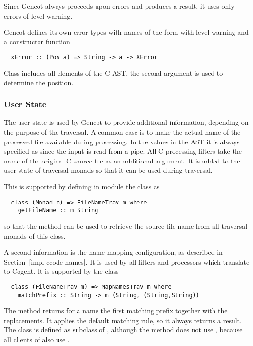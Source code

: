 Since Gencot always proceeds upon errors and produces a result, it uses only errors of level warning.

Gencot defines its own error types with names of the form  with level warning and a constructor function
\begin{verbatim}
  xError :: (Pos a) => String -> a -> XError
\end{verbatim}
Class  includes all elements of the C AST, the second argument is used to determine the position.

\subsubsection{User State}

The user state is used by Gencot to provide additional information, depending on the purpose of the traversal.
A common case is to make the actual name of the processed file available during processing. In the 
values in the AST it is always specified as  since the input is read from a pipe. All C processing 
filters take the name of the original C source file as an additional argument. It is added to the user state 
of traversal monads so that it can be used during traversal.

This is supported by defining in module  the class  as
\begin{verbatim}
  class (Monad m) => FileNameTrav m where
    getFileName :: m String
\end{verbatim}
so that the method  can be used to retrieve the source file name from all traversal monads of 
this class. 

A second information is the name mapping configuration, as described in Section~\ref{impl-ccode-names}.
It is used by all filters and processors which translate to Cogent. It is supported by the class 
\begin{verbatim}
  class (FileNameTrav m) => MapNamesTrav m where
    matchPrefix :: String -> m (String, (String,String))
\end{verbatim}
The method  returns for a name the first matching prefix together with the replacements. It 
applies the default matching rule, so it always returns a result. The class is defined as subclass of 
, although the method does not use , because all clients of 
also use .

